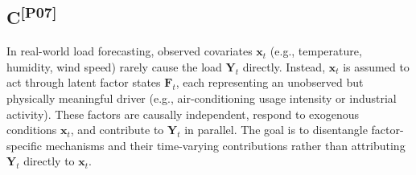 ﻿\documentclass[journal]{IEEEtran}
\DeclareRobustCommand{\auditbad}[2]{{\color{auditred}#1}{\color{auditred}\textsuperscript{[#2]}}}
\begin{document}









\subsection{\auditbad{C}{P07}}
In real-world load forecasting, observed covariates $\mathbf{x}_t$ (e.g., temperature, humidity, wind speed) rarely cause the load $\mathbf{Y}_t$ directly. Instead, $\mathbf{x}_t$ is assumed to act through latent factor states $\mathbf{F}_t$, each representing an unobserved but physically meaningful driver (e.g., air-conditioning usage intensity or industrial activity). These factors are causally independent, respond to exogenous conditions $\mathbf{x}_t$, and contribute to $\mathbf{Y}_t$ in parallel. The goal is to disentangle factor-specific mechanisms and their time-varying contributions rather than attributing $\mathbf{Y}_t$ directly to $\mathbf{x}_t$. 
\end{document}
